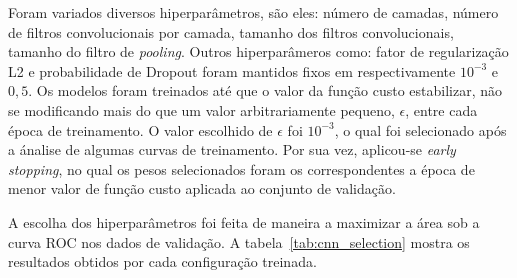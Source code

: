 Foram variados diversos hiperparâmetros, são eles: número de camadas, número de filtros convolucionais por camada,
tamanho dos filtros convolucionais, tamanho do filtro de \textit{pooling}.
Outros hiperparâmeros como: fator de regularização L2 e probabilidade de Dropout foram mantidos fixos em
respectivamente $10^{-3}$ e $0,5$.
Os modelos foram treinados até que o valor da função custo estabilizar, não se modificando mais do que um valor
arbitrariamente pequeno, $\epsilon$, entre cada época de treinamento.
O valor escolhido de $\epsilon$ foi $10^{-3}$, o qual foi selecionado após a ánalise de algumas curvas de treinamento.
Por sua vez, aplicou-se \textit{early stopping}, no qual os pesos selecionados foram os correspondentes a época de menor
valor de função custo aplicada ao conjunto de validação.

A escolha dos hiperparâmetros foi feita de maneira a maximizar a área sob a curva ROC nos dados de validação.
A tabela~\ref{tab:cnn_selection} mostra os resultados obtidos por cada configuração treinada.

